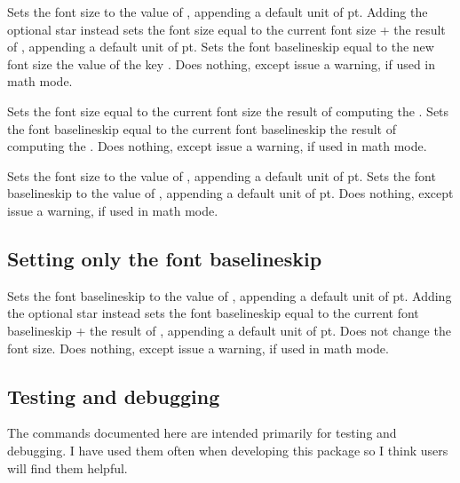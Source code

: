 \documentclass{beery}
\begin{document}
 \sarg{} 
\KeepNextPar*

Sets the font size to the value of , appending a default unit of \unit{pt}.
Adding the optional star instead sets the font size equal to the current font size + the result of , appending a default unit of \unit{pt}.
Sets the font baselineskip equal to the new font size \texttimes{} the value of the key .
Does nothing, except issue a warning, if used in math mode.

 
\KeepNextPar*

Sets the font size equal to the current font size \texttimes{} the result of computing the .
Sets the font baselineskip equal to the current font baselineskip \texttimes{} the result of computing the .
Does nothing, except issue a warning, if used in math mode.

  
\KeepNextPar*

Sets the font size to the value of , appending a default unit of \unit{pt}.
Sets the font baselineskip to the value of , appending a default unit of \unit{pt}.
Does nothing, except issue a warning, if used in math mode.

\subsection{Setting only the font baselineskip}
\label{subsec:setfontbaselineskip}

 \sarg{} 
\KeepNextPar*

Sets the font baselineskip to the value of , appending a default unit of \unit{pt}.
Adding the optional star instead sets the font baselineskip equal to the current font baselineskip + the result of , appending a default unit of \unit{pt}.
Does not change the font size.
Does nothing, except issue a warning, if used in math mode.

\subsection{Testing and debugging}
\label{subsec:debug}

The commands documented here are intended primarily for testing and debugging.
I have used them often when developing this package so I think users will find them helpful.
\end{document}
